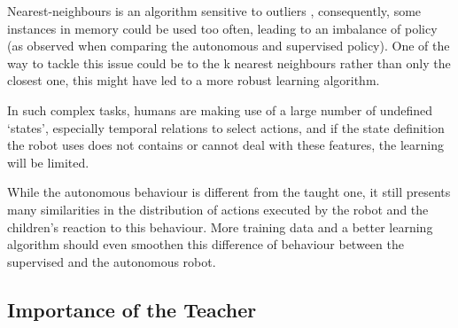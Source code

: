 Nearest-neighbours is an algorithm sensitive to outliers , consequently, some instances in memory could be used too often, leading to an imbalance of policy (as observed when comparing the autonomous and supervised policy). One of the way to tackle this issue could be to the k nearest neighbours rather than only the closest one, this might have led to a more robust learning algorithm. 




In such complex tasks, humans are making use of a large number of undefined  `states', especially temporal relations to select actions, and if the state definition the robot uses does not contains or cannot deal with these features, the learning will be limited.

 While the autonomous behaviour is different from the taught one, it still presents many similarities in the distribution of actions executed by the robot and the children's reaction to this behaviour. More training data and a better learning algorithm should even smoothen this difference of behaviour between the supervised and the autonomous robot. 

\subsection{Importance of the Teacher}

